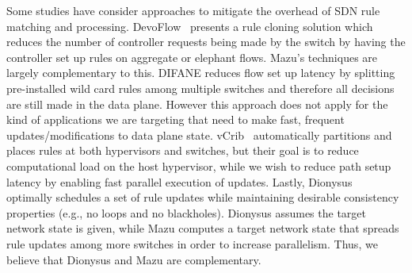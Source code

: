 Some studies have consider approaches to mitigate the overhead of SDN
rule matching and processing. DevoFlow~\cite{devoflow} presents
a rule cloning solution which reduces the number of controller
requests being made by the switch by having the controller set up
rules on aggregate or elephant flows. Mazu's techniques are largely
complementary to this. 
DIFANE \cite{difane} reduces flow set up latency by splitting
pre-installed wild card rules among multiple switches and therefore
all decisions are still made in the data plane.  However this approach does not
apply for the kind of applications we are targeting that need to make fast,
frequent updates/modifications to data plane state. 
vCrib~\cite{minlanvcrib} automatically partitions and places rules at both hypervisors and
switches, but their goal is to reduce computational load on the
host hypervisor, while we wish to reduce path setup latency by enabling fast
parallel execution of updates.
Lastly, Dionysus~\cite{dionysus} optimally schedules a set of rule updates 
while maintaining desirable consistency properties (e.g., no loops and no
blackholes). Dionysus assumes the target network state is given, while Mazu
computes a target network state that spreads rule updates among more switches
in order to increase parallelism. Thus, we believe that Dionysus and Mazu are
complementary.

